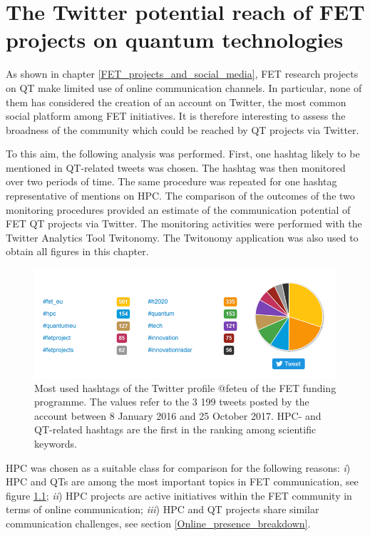 \chapter{The Twitter potential reach of FET projects on quantum technologies}
As shown in chapter \ref{FET_projects_and_social_media}, FET research projects on QT make limited use of online communication channels. In particular, none of them has considered the creation of an account on Twitter, the most common social platform among FET initiatives. It is therefore interesting to assess the broadness of the community which could be reached by QT projects via Twitter.

To this aim, the following analysis was performed. First, one hashtag likely to be mentioned in QT-related tweets was chosen. The hashtag was then monitored over two periods of time. The same procedure was repeated for one hashtag representative of mentions on HPC. The comparison of the outcomes of the two monitoring procedures provided an estimate of the communication potential of FET QT projects via Twitter. The monitoring activities were performed with the Twitter Analytics Tool Twitonomy. The Twitonomy application was also used to obtain all figures in this chapter.

\begin{figure}[!t] 
 \begin{center}
 \includegraphics[scale=0.58]{Images/Hashtags_feteu.png}
 \caption{Most used hashtags of the Twitter profile @fet\textunderscore eu of the FET funding programme. The values refer to the 3 199 tweets posted by the account between 8 January 2016 and 25 October 2017. HPC- and QT-related hashtags are the first in the ranking among scientific keywords.}
 \label{Hashtags_feteu}
 \end{center}
\end{figure}

HPC was chosen as a suitable class for comparison for the following reasons: \textit{i}) HPC and QTs are among the most important topics in FET communication, see figure \ref{Hashtags_feteu}; \textit{ii}) HPC projects are active initiatives within the FET community in terms of online communication; \textit{iii}) HPC and QT projects share similar communication challenges, see section \ref{Online_presence_breakdown}.

